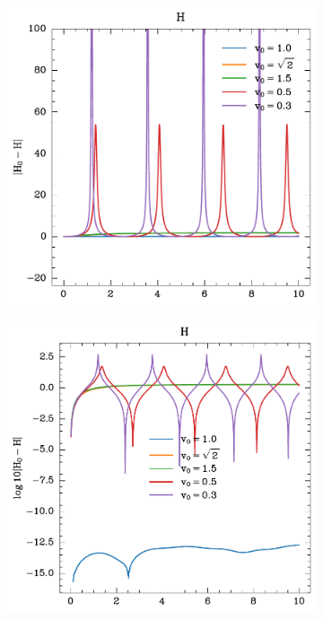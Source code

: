 \begin{figure}
    \label{fig:1-1-energija}
    \centering
    \begin{subfigure}{0.49\textwidth}
        \includegraphics[width=\textwidth]{../images/1-1-H_lin.pdf}
    \end{subfigure}
    \hfill
    \begin{subfigure}{0.49\textwidth}
        \includegraphics[width=\textwidth]{../images/1-1-H_log.pdf}

\end{subfigure}
\end{figure}
